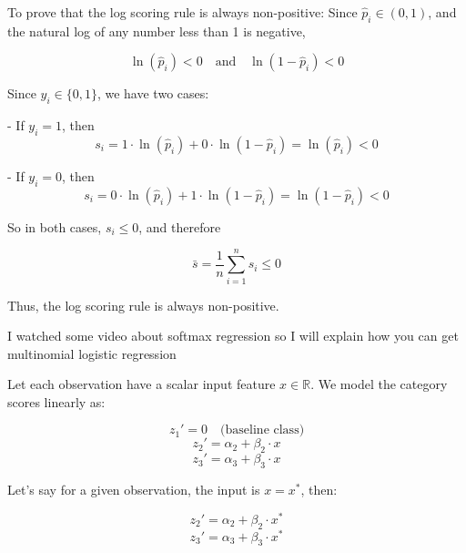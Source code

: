 \documentclass[12pt]{article}
\begin{document}
\begin{enumerate}
To prove that the log scoring rule is always non-positive:  
Since \( \hat{p}_i \in (0, 1) \), and the natural log of any number less than 1 is negative,

\[
\ln(\hat{p}_i) < 0 \quad \text{and} \quad \ln(1 - \hat{p}_i) < 0
\]

Since \( y_i \in \{0, 1\} \), we have two cases:

- If \( y_i = 1 \), then
\[
s_i = 1 \cdot \ln(\hat{p}_i) + 0 \cdot \ln(1 - \hat{p}_i) = \ln(\hat{p}_i) < 0
\]

- If \( y_i = 0 \), then
\[
s_i = 0 \cdot \ln(\hat{p}_i) + 1 \cdot \ln(1 - \hat{p}_i) = \ln(1 - \hat{p}_i) < 0
\]

So in both cases, \( s_i \leq 0 \), and therefore

\[
\bar{s} = \frac{1}{n} \sum_{i=1}^n s_i \leq 0
\]

Thus, the log scoring rule is always non-positive.

\pagebreak

I watched some video about softmax regression so I will explain how you can get multinomial logistic regression

Let each observation have a scalar input feature $x \in \mathbb{R}$.  
We model the category scores linearly as:

\[
z_1' = 0 \quad \text{(baseline class)}
\]
\[
z_2' = \alpha_2 + \beta_2 \cdot x
\]
\[
z_3' = \alpha_3 + \beta_3 \cdot x
\]

Let’s say for a given observation, the input is $x = x^*$, then:

\[
z_2' = \alpha_2 + \beta_2 \cdot x^*
\]
\[
z_3' = \alpha_3 + \beta_3 \cdot x^*
\]


\end{enumerate}
\end{document}
